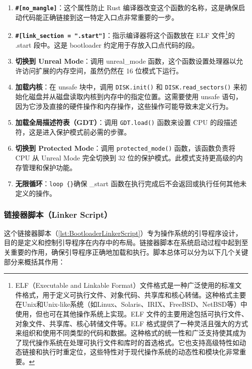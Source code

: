 \begin{enumerate}
    \item \textbf{\texttt{\#[no\_mangle]}}：这个属性防止 Rust 编译器改变这个函数的名称，这是确保启动代码能正确链接到这一特定入口点非常重要的一步。
    \item \textbf{\texttt{\#[link\_section = ".start"]}}：指示编译器将这个函数放在 ELF 文件\footnote{ELF（Executable and Linkable Format）文件格式是一种广泛使用的标准文件格式，用于定义可执行文件、对象代码、共享库和核心转储。这种格式主要在Unix和Unix-like系统（如Linux、Solaris、IRIX、FreeBSD、NetBSD等）中使用，但也可在其他操作系统上实现。ELF 文件的主要用途包括可执行文件、对象文件、共享库、核心转储文件等。ELF 格式提供了一种灵活且强大的方式来组织和使用不同类型的代码和数据。这种格式的统一性和广泛支持使其成为了现代操作系统在处理可执行文件和库时的首选格式。它也支持高级特性如动态链接和执行时重定位，这些特性对于现代操作系统的动态性和模块化非常重要。}的 .start 段中。这是 bootloader 约定用于存放入口点代码的段。
    \item \textbf{切换到 Unreal Mode}：调用 unreal\_mode 函数，这个函数设置处理器以允许访问扩展的内存空间，虽然仍然在 16 位模式下运行。
    \item \textbf{加载内核}：在 unsafe 块中，调用 \texttt{DISK.init()} 和 \texttt{DISK.read\_sectors()} 来初始化磁盘并从磁盘读取内核到内存中的指定位置。这需要使用 unsafe 语句，因为它涉及直接的硬件操作和内存操作，这些操作可能导致未定义行为。
    \item \textbf{加载全局描述符表（GDT）}：调用 \texttt{GDT.load()} 函数来设置 CPU 的段描述符，这是进入保护模式前必需的步骤。
    \item \textbf{切换到 Protected Mode}：调用 \texttt{protected\_mode()} 函数，该函数负责将 CPU 从 Unreal Mode 完全切换到 32 位的保护模式。此模式支持更高级的内存管理和保护功能。
    \item \textbf{无限循环}：\texttt{loop \{\}}确保 \_start 函数在执行完成后不会返回或执行任何其他未定义的操作。
\end{enumerate}

\subsubsection{链接器脚本（Linker Script）}

这个链接器脚本（\cref{lst:BootloaderLinkerScript}）专为操作系统的引导程序设计，目的是定义和控制引导程序在内存中的布局。链接器脚本在系统启动过程中起到至关重要的作用，确保引导程序正确地加载和执行。脚本总体可以分为以下几个关键部分来概括其作用：

